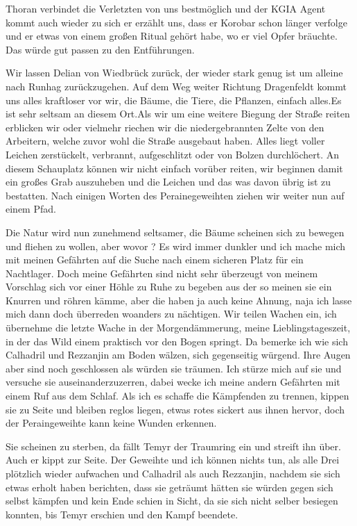 \documentclass[11pt]{scrreprt}
\begin{document}
Thoran verbindet die Verletzten von uns bestmöglich und der KGIA Agent kommt auch wieder zu sich er erzählt uns, dass er Korobar schon länger verfolge und er etwas von einem großen Ritual gehört habe, wo er viel Opfer bräuchte. Das würde gut passen zu den Entführungen.\par
Wir lassen Delian von Wiedbrück zurück, der wieder stark genug ist um alleine nach Runhag zurückzugehen.
Auf dem Weg weiter Richtung Dragenfeldt  kommt uns alles kraftloser vor wir, die Bäume, die Tiere, die Pflanzen, einfach alles.Es ist sehr seltsam an diesem Ort.Als wir um eine weitere Biegung der Straße reiten erblicken wir oder vielmehr riechen wir die niedergebrannten Zelte von den Arbeitern, welche zuvor wohl die Straße ausgebaut haben. Alles liegt voller Leichen zerstückelt, verbrannt, aufgeschlitzt oder von Bolzen durchlöchert. An diesem Schauplatz können wir nicht einfach vorüber reiten, wir beginnen damit ein großes Grab auszuheben und die Leichen und das was davon übrig ist zu bestatten. Nach einigen Worten des Perainegeweihten ziehen wir weiter nun auf einem Pfad.\par
Die Natur wird nun zunehmend seltsamer, die Bäume scheinen sich zu bewegen und fliehen zu wollen, aber wovor ? Es wird immer dunkler und ich mache mich mit meinen Gefährten auf die Suche nach einem sicheren Platz für ein Nachtlager. Doch meine Gefährten sind nicht sehr überzeugt von meinem Vorschlag sich vor einer Höhle zu Ruhe zu begeben aus der so meinen sie ein Knurren und röhren kämme, aber die haben ja auch keine Ahnung, naja ich lasse mich dann doch überreden woanders zu nächtigen. Wir teilen Wachen ein, ich übernehme die letzte Wache in der Morgendämmerung, meine Lieblingstageszeit, in der das Wild einem praktisch vor den Bogen springt. Da bemerke ich wie sich Calhadril und Rezzanjin am Boden wälzen, sich gegenseitig würgend. Ihre Augen aber sind noch geschlossen als würden sie träumen. Ich stürze mich auf sie und versuche sie auseinanderzuzerren, dabei wecke ich meine andern Gefährten mit einem Ruf aus dem Schlaf. Als ich es schaffe die Kämpfenden zu trennen, kippen sie zu Seite und bleiben reglos liegen, etwas rotes sickert aus ihnen hervor, doch der Peraingeweihte kann keine Wunden erkennen.\par
Sie scheinen zu sterben, da fällt Temyr der Traumring ein und streift ihn über. Auch er kippt zur Seite. Der Geweihte und ich können nichts tun, als alle Drei plötzlich wieder aufwachen und Calhadril als auch Rezzanjin, nachdem sie sich etwas erholt haben berichten, dass sie geträumt hätten sie würden gegen sich selbst kämpfen und kein Ende schien in Sicht, da sie sich nicht selber besiegen konnten, bis Temyr erschien und den Kampf beendete.\par
\end{document}
